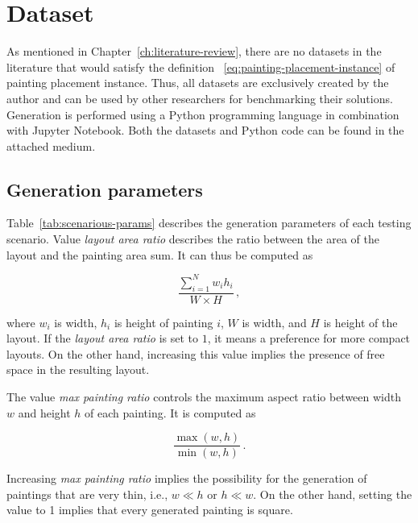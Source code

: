 \section{Dataset}\label{sec:dataset}

As mentioned in Chapter~\ref{ch:literature-review}, there are no datasets in the
literature that would satisfy the definition ~\ref{eq:painting-placement-instance} of painting placement instance.
Thus, all datasets are exclusively created by the author and can be used by other researchers
for benchmarking their solutions.
Generation is performed using a Python programming language in combination with Jupyter Notebook.
Both the datasets and Python code can be found in the attached medium.

\subsection{Generation parameters}\label{subsec:generation-parameters}

Table~\ref{tab:scenarious-params} describes the generation parameters of each testing scenario. Value \textit{layout area ratio}
describes the ratio between the area of the layout and the painting area sum. It can thus be computed as

\[
    \dfrac{\sum\limits_{i=1}^{N} w_i h_i}{W \times H}\,,
\]

where $w_i$ is width, $h_i$ is height of painting $i$, $W$ is width, and $H$ is height of the layout.
If the \textit{layout area ratio} is set to $1$, it means a preference for more compact layouts. On the other hand,
increasing this value implies the presence of free space in the resulting layout.

The value \textit{max painting ratio} controls the maximum aspect ratio between width $w$ and height $h$ of each painting.
It is computed as

\[
    \dfrac{\max(w,h)}{\min(w,h)}\,.
\]

Increasing \textit{max painting ratio} implies the possibility for the generation of paintings
that are very thin, i.e., $w \ll h$ or $h \ll w$. On the other hand, setting the value to 1
implies that every generated painting is square.

